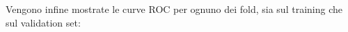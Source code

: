 Vengono infine mostrate le curve ROC per ognuno dei fold, sia sul training che 
sul validation set:

%	
%	
%	
%	
%	
%	
%	
%	
%	
%	

